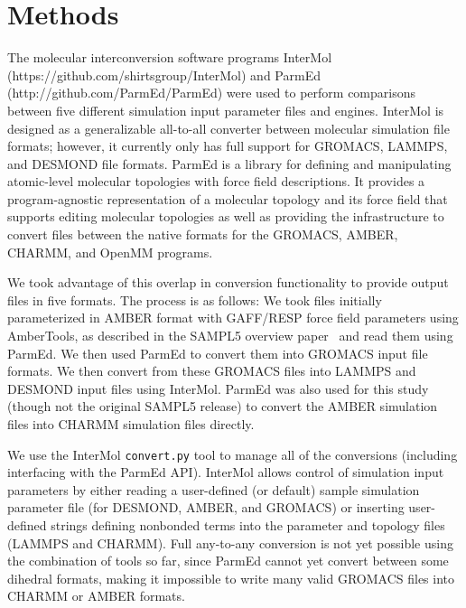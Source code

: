 
\section*{Methods}
\begin{sloppypar}
The molecular interconversion software programs InterMol
(https://github.com/shirtsgroup/InterMol) and ParmEd
(http://github.com/ParmEd/ParmEd) were used to perform comparisons
between five different simulation input parameter files and engines.
InterMol is designed as a generalizable all-to-all converter between
molecular simulation file formats; however, it currently only has full
support for GROMACS, LAMMPS, and DESMOND file formats.  ParmEd is
a library for defining and manipulating atomic-level molecular topologies with
force field descriptions. It provides a program-agnostic representation of a
molecular topology and its force field that supports editing molecular
topologies as well as providing the infrastructure to convert files between the
native formats for the GROMACS, AMBER, CHARMM, and OpenMM programs.
\end{sloppypar}

We took advantage of this overlap in conversion functionality to
provide output files in five formats. The process is as follows: We
took files initially parameterized in AMBER format with GAFF/RESP force field 
parameters using AmberTools, as described in the SAMPL5 overview paper~\cite{SAMPL5Overview}
and read them using ParmEd. We then used ParmEd to convert them into
GROMACS input file formats. We then convert from these GROMACS files
into LAMMPS and DESMOND input files using InterMol.  ParmEd was also
used for this study (though not the original SAMPL5 release) to
convert the AMBER simulation files into CHARMM simulation files
directly.

We use the InterMol {\tt convert.py} tool to manage all of the conversions
(including interfacing with the ParmEd API). InterMol allows control
of simulation input parameters by either reading a user-defined (or
default) sample simulation parameter file (for DESMOND, AMBER, and
GROMACS) or inserting user-defined strings defining nonbonded terms
into the parameter and topology files (LAMMPS and CHARMM). Full
any-to-any conversion is not yet possible using the combination of
tools so far, since ParmEd cannot yet convert between some dihedral
formats, making it impossible to write many valid GROMACS files into
CHARMM or AMBER formats.

